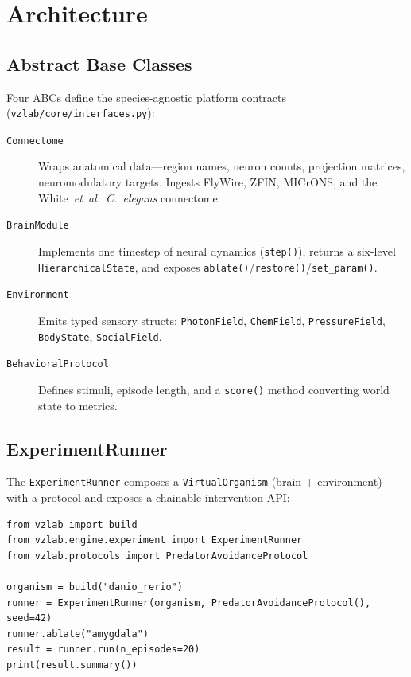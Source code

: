 \documentclass[11pt,a4paper]{article}
\begin{document}
\section{Architecture}

\subsection{Abstract Base Classes}

Four ABCs define the species-agnostic platform contracts
(\texttt{vzlab/core/interfaces.py}):

\begin{description}
  \item[\texttt{Connectome}] Wraps anatomical data---region names,
    neuron counts, projection matrices, neuromodulatory targets.
    Ingests FlyWire, ZFIN, MICrONS, and the White~\textit{et~al.}\
    \textit{C.\ elegans} connectome.
  \item[\texttt{BrainModule}] Implements one timestep of neural
    dynamics (\texttt{step()}), returns a six-level
    \texttt{HierarchicalState}, and exposes
    \texttt{ablate()}/\texttt{restore()}/\texttt{set\_param()}.
  \item[\texttt{Environment}] Emits typed sensory structs:
    \texttt{PhotonField}, \texttt{ChemField}, \texttt{PressureField},
    \texttt{BodyState}, \texttt{SocialField}.
  \item[\texttt{BehavioralProtocol}] Defines stimuli, episode length,
    and a \texttt{score()} method converting world state to metrics.
\end{description}

\subsection{ExperimentRunner}

The \texttt{ExperimentRunner} composes a \texttt{VirtualOrganism}
(brain + environment) with a protocol and exposes a chainable
intervention API:

\begin{lstlisting}
from vzlab import build
from vzlab.engine.experiment import ExperimentRunner
from vzlab.protocols import PredatorAvoidanceProtocol

organism = build("danio_rerio")
runner = ExperimentRunner(organism, PredatorAvoidanceProtocol(), seed=42)
runner.ablate("amygdala")
result = runner.run(n_episodes=20)
print(result.summary())
\end{lstlisting}
\end{document}
